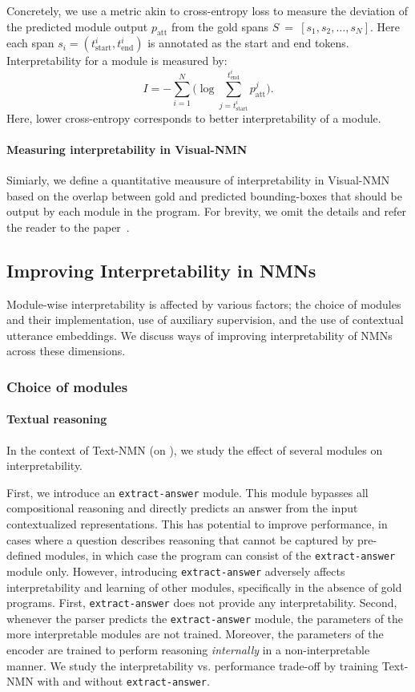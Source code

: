 \documentclass[main.tex]{subfiles}
\begin{document}
Concretely, we use a metric akin to cross-entropy loss to measure the deviation of the predicted module output $p_{\text{att}}$ from the gold spans  $S~=~[s_{1}, s_{2}, \ldots, s_{N}]$. Here each span $s_{i} = (t^{i}_{\text{start}}, t^{i}_{\text{end}})$ is annotated as the start and end tokens.
Interpretability for a module is measured by:
\begin{equation*}
    I = - \sum_{i=1}^{N}  \Bigg(\log \sum_{j = t^{i}_{\text{start}}}^{t^{i}_{\text{end}}} p_{\text{att}}^{j} \Bigg).
\end{equation*}
Here, lower cross-entropy corresponds to better interpretability of a module.

\paragraph{Measuring interpretability in Visual-NMN}
Simiarly, we define a quantitative meausure of interpretability in Visual-NMN based on the overlap between gold and predicted bounding-boxes that should be output by each module in the program. For brevity, we omit the details and refer the reader to the paper~\missingcite{}.


\subsection{Improving Interpretability in NMNs}
\label{ssec:interpret}
Module-wise interpretability is affected by various factors; the choice of modules and their implementation, use of auxiliary supervision, and the use of contextual utterance embeddings. We discuss ways of improving interpretability of NMNs across these dimensions.

\subsubsection{Choice of modules}
\paragraph{Textual reasoning}
In the context of Text-NMN (on \drop{}), we study the effect of several modules on interpretability.

First, we introduce an \texttt{extract-answer} module. This module bypasses all compositional reasoning and directly predicts an answer from the input contextualized representations. This has potential to improve performance, in cases
where a question describes reasoning that cannot be captured by pre-defined modules, in which case the program can consist of the \texttt{extract-answer} module only.
However, introducing \texttt{extract-answer} adversely affects interpretability and learning of other modules, specifically in the absence of gold programs. First, \texttt{extract-answer} does not provide any interpretability. Second, whenever the parser predicts the \texttt{extract-answer} module, the parameters of the more interpretable modules are not trained. Moreover, the parameters of the encoder are trained to perform reasoning \emph{internally} in a non-interpretable manner. We study the interpretability vs. performance trade-off by training Text-NMN with and without \texttt{extract-answer}.
\end{document}
